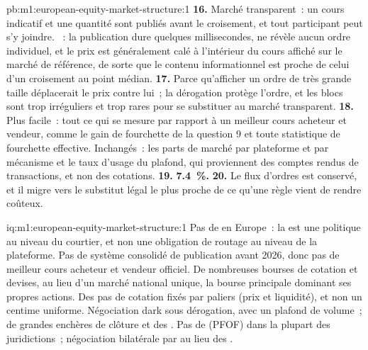 \begin{solution}{pb:m1:european-equity-market-structure:1}
\textbf{16.} Marché transparent~: un cours indicatif et une quantité sont publiés avant le
croisement, et tout participant peut s'y joindre. ~: la publication dure
quelques millisecondes, ne révèle aucun ordre individuel, et le prix est généralement calé
à l'intérieur du cours affiché sur le marché de référence, de sorte que le contenu informationnel est proche
de celui d'un croisement au point médian.
\textbf{17.} Parce qu'afficher un ordre de très grande taille déplacerait le prix
contre lui~; la dérogation protège l'ordre, et les blocs sont trop irréguliers et trop
rares pour se substituer au marché transparent.
\textbf{18.} Plus facile~: tout ce qui se mesure par rapport à un meilleur cours acheteur et vendeur, comme
le gain de fourchette de la question 9 et toute statistique de fourchette effective. Inchangés~:
les parts de marché par plateforme et par mécanisme et le taux d'usage du plafond, qui proviennent des
comptes rendus de transactions, et non des cotations.
\textbf{19.} \textbf{7.4~\%.}
\textbf{20.} Le flux d'ordres est conservé, et il migre vers le substitut légal le plus proche
de ce qu'une règle vient de rendre coûteux.
\end{solution}

\begin{solution}{iq:m1:european-equity-market-structure:1}
Pas de  en Europe~: la  est une politique au niveau du courtier,
et non une obligation de routage au niveau de la plateforme. Pas de système consolidé de publication avant 2026, donc pas de
meilleur cours acheteur et vendeur officiel. De nombreuses bourses de cotation et devises, au lieu d'un
marché national unique, la bourse principale dominant ses propres actions.
Des pas de cotation fixés par paliers (prix et liquidité), et non un centime uniforme. Négociation dark
sous dérogation, avec un plafond de volume~; de grandes enchères de clôture et des .
Pas de  (PFOF) dans la plupart des juridictions~; négociation bilatérale par
 au lieu des .
\end{solution}

